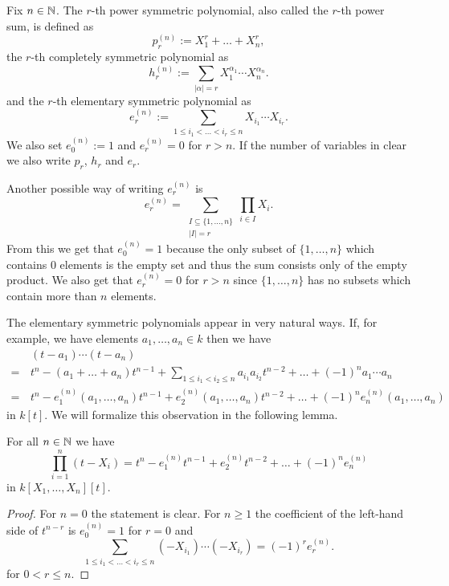 \begin{defi}
 Fix $n \in \mathbb{N}$. The $r$-th power symmetric polynomial, also called the $r$-th power sum, is defined as
 \[
  p_r^{(n)} := X_1^r + \ldots + X_n^r,
 \]
 the $r$-th completely symmetric polynomial as
 \[
  h_r^{(n)} := \sum_{|\alpha|=r} X_1^{\alpha_1} \cdots X_n^{\alpha_n}.
 \]
 and the $r$-th elementary symmetric polynomial as
 \[
  e_r^{(n)} := \sum_{1 \leq i_1 < \ldots < i_r \leq n} X_{i_1} \cdots X_{i_r}.
 \]
 We also set $e_0^{(n)} := 1$ and $e_r^{(n)} = 0$ for $r > n$. If the number of variables in clear we also write $p_r$, $h_r$ and $e_r$.
\end{defi}

Another possible way of writing $e^{(n)}_r$ is
\[
 e^{(n)}_r = \sum_{\substack{I \subseteq \{1, \ldots, n\} \\ |I| = r}} \prod_{i \in I} X_i.
\]
From this we get that $e^{(n)}_0 = 1$ because the only subset of $\{1, \ldots, n\}$ which contains $0$ elements is the empty set and thus the sum consists only of the empty product. We also get that $e^{(n)}_r = 0$ for $r > n$ since $\{1, \ldots, n\}$ has no subsets which contain more than $n$ elements.

The elementary symmetric polynomials appear in very natural ways. If, for example, we have elements $a_1, \ldots, a_n \in k$ then we have
\begin{align*}
  &\, (t-a_1) \cdots (t-a_n) \\
 =&\, t^n - (a_1 + \ldots + a_n) t^{n-1} + \sum_{1 \leq i_1 < i_2 \leq n} a_{i_1} a_{i_2} t^{n-2} + \ldots + (-1)^n a_1 \cdots a_n \\ 
 =&\, t^n - e^{(n)}_1(a_1, \ldots, a_n) t^{n-1} + e^{(n)}_2(a_1, \ldots, a_n) t^{n-2} + \ldots + (-1)^n e^{(n)}_n(a_1, \ldots, a_n)
\end{align*}
in $k[t]$. We will formalize this observation in the following lemma.


\begin{lem}
 For all $n \in \mathbb{N}$ we have
 \[
  \prod_{i=1}^n (t-X_i) = t^n - e^{(n)}_1 t^{n-1} + e^{(n)}_2 t^{n-2} + \ldots + (-1)^n e^{(n)}_n
 \]
 in $k[X_1, \ldots, X_n][t]$.
\end{lem}
\begin{proof}
 For $n = 0$ the statement is clear. For $n \geq 1$ the coefficient of the left-hand side of $t^{n-r}$ is $e^{(n)}_0 = 1$ for $r = 0$ and
 \[
  \sum_{1 \leq i_1 < \ldots < i_r \leq n} (-X_{i_1}) \cdots (-X_{i_r}) = (-1)^r e^{(n)}_r.
 \]
 for $0 < r \leq n$.
\end{proof}


